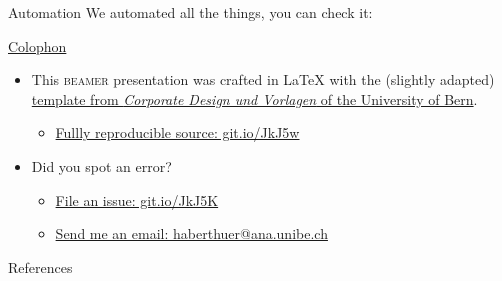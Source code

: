 \documentclass[aspectratio=169]{beamer}
\begin{document}

\begin{frame}{Automation}
We automated all the things, you can check it: \cite{Haberthur2020a}
\end{frame}

\begin{frame}{\href{https://en.wikipedia.org/wiki/Colophon_(publishing)}{Colophon}}
	\begin{itemize}
		\item This \textsc{beamer} presentation was crafted in \LaTeX\xspace with the (slightly adapted) \href{http://intern.unibe.ch/dienstleistungen/corporate_design_und_vorlagen/praesentationen/index_ger.html}{template from \emph{Corporate Design und Vorlagen} of the University of Bern}.
		\begin{itemize}
			\item \href{https://github.com/habi/20201112_Anatomie_Seminar}{Fullly reproducible source: git.io/JkJ5w}
		\end{itemize}
		\item Did you spot an error?
		\begin{itemize}
			\item \href{https://github.com/habi/20201112_Anatomie_Seminar/issues}{File an issue: git.io/JkJ5K}
			\item \href{mailto:haberthuer@ana.unibe.ch?subject=Error\%20in\%20the\%20seminar\%20presentation\&body=https://xkcd.com/386/}{Send me an email: haberthuer@ana.unibe.ch}
		\end{itemize}
	\end{itemize}
\end{frame}

\begin{frame}{References}
	\renewcommand*{\bibfont}{\tiny}
	\printbibliography
\end{frame}
\end{document}
